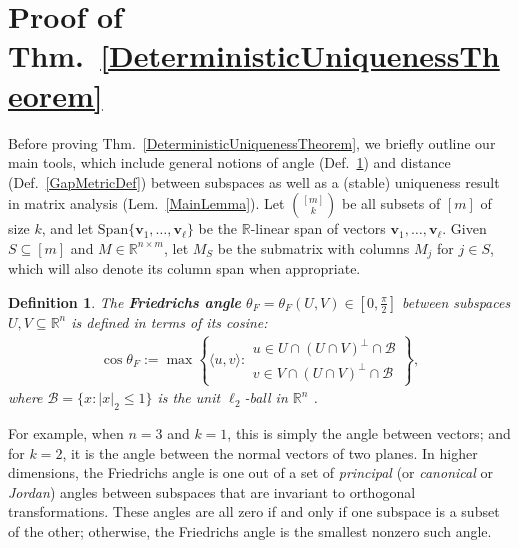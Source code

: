 \documentclass[journal, twocolumn]{IEEEtran}
\newtheorem{definition}{Definition}
\begin{document}
\section{Proof of Thm.~\ref{DeterministicUniquenessTheorem}}\label{DUT}
Before proving Thm.~\ref{DeterministicUniquenessTheorem}, we briefly outline our main tools, which include general notions of angle (Def.~\ref{FriedrichsDefinition}) and distance (Def.~\ref{GapMetricDef}) between subspaces as well as a (stable) uniqueness result in matrix analysis (Lem.~\ref{MainLemma}).
Let ${[m] \choose k}$ be all subsets of $[m]$ of size $k$, and let $\text{Span}\{\mathbf{v}_1, \ldots, \mathbf{v}_\ell\}$ be the $\mathbb{R}$-linear span of vectors $\mathbf{v}_1, \ldots, \mathbf{v}_\ell$. Given $S \subseteq [m]$ and $M \in \mathbb{R}^{n \times m}$, let $M_S$ be the submatrix with columns $M_j$ for $j \in S$, which will also denote its column span when appropriate.  

\begin{definition}\label{FriedrichsDefinition}
The \textbf{Friedrichs angle} $\theta_F = \theta_F(U,V) \in [0,\frac{\pi}{2}]$ between subspaces $U,V \subseteq \mathbb{R}^n$ is defined in terms of its cosine:
\begin{align*}
\cos{\theta_F} := \max\left\{ \langle u, v \rangle: \substack{ u \in U \cap (U \cap V)^\perp \cap \mathcal{B} \\ v \in V \cap (U \cap V)^\perp \cap \mathcal{B} } \right\},
\end{align*}
where $\mathcal{B} = \{ x: |x|_2 \leq 1\}$ is the unit $\ell_2$-ball in $\mathbb{R}^n$ \cite{Deutsch12}.
\end{definition}
For example, when $n=3$ and $k=1$, this is simply the angle between vectors; and for $k=2$, it is the angle between the normal vectors of two planes. In higher dimensions, the Friedrichs angle is one out of a set of \textit{principal} (or \textit{canonical} or \textit{Jordan}) angles between subspaces that are invariant to orthogonal transformations. These angles are all zero if and only if one subspace is a subset of the other; otherwise, the Friedrichs angle is the smallest nonzero such angle. 
\end{document}
